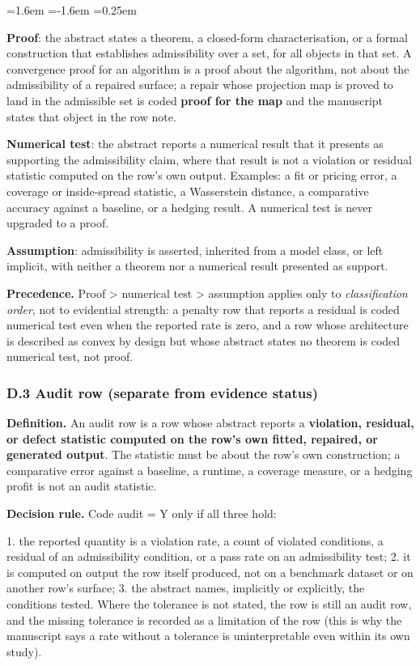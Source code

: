 \documentclass[11pt]{article}
\begin{document}
\begin{list}{}{\leftmargin=1.6em \itemindent=-1.6em \itemsep=0.25em}
\item \textbf{Proof}: the abstract states a theorem, a closed-form characterisation, or a formal construction that establishes admissibility over a set, for all objects in that set. A convergence proof for an algorithm is a proof about the algorithm, not about the admissibility of a repaired surface; a repair whose projection map is proved to land in the admissible set is coded \textbf{proof for the map} and the manuscript states that object in the row note.
\item \textbf{Numerical test}: the abstract reports a numerical result that it presents as supporting the admissibility claim, where that result is not a violation or residual statistic computed on the row's own output. Examples: a fit or pricing error, a coverage or inside-spread statistic, a Wasserstein distance, a comparative accuracy against a baseline, or a hedging result. A numerical test is never upgraded to a proof.
\item \textbf{Assumption}: admissibility is asserted, inherited from a model class, or left implicit, with neither a theorem nor a numerical result presented as support.
\end{list}
\textbf{Precedence.} Proof > numerical test > assumption applies only to \textit{classification order}, not to evidential strength: a penalty row that reports a residual is coded numerical test even when the reported rate is zero, and a row whose architecture is described as convex by design but whose abstract states no theorem is coded numerical test, not proof.

\subsubsection*{D.3 Audit row (separate from evidence status)}
\textbf{Definition.} An audit row is a row whose abstract reports a \textbf{violation, residual, or defect statistic computed on the row's own fitted, repaired, or generated output}. The statistic must be about the row's own construction; a comparative error against a baseline, a runtime, a coverage measure, or a hedging profit is not an audit statistic.

\textbf{Decision rule.} Code audit = Y only if all three hold:

1. the reported quantity is a violation rate, a count of violated conditions, a residual of an admissibility condition, or a pass rate on an admissibility test; 2. it is computed on output the row itself produced, not on a benchmark dataset or on another row's surface; 3. the abstract names, implicitly or explicitly, the conditions tested. Where the tolerance is not stated, the row is still an audit row, and the missing tolerance is recorded as a limitation of the row (this is why the manuscript says a rate without a tolerance is uninterpretable even within its own study).
\end{document}
